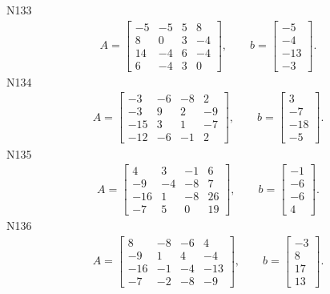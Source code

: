 \documentclass[11pt]{report}
\begin{document}
N133
\begin{align*}
 A = \left[\begin{matrix}-5 & -5 & 5 & 8\\8 & 0 & 3 & -4\\14 & -4 & 6 & -4\\6 & -4 & 3 & 0\end{matrix}\right],
\qquad b = \left[\begin{matrix}-5\\-4\\-13\\-3\end{matrix}\right]. 
 \end{align*}
N134
\begin{align*}
 A = \left[\begin{matrix}-3 & -6 & -8 & 2\\-3 & 9 & 2 & -9\\-15 & 3 & 1 & -7\\-12 & -6 & -1 & 2\end{matrix}\right],
\qquad b = \left[\begin{matrix}3\\-7\\-18\\-5\end{matrix}\right]. 
 \end{align*}
N135
\begin{align*}
 A = \left[\begin{matrix}4 & 3 & -1 & 6\\-9 & -4 & -8 & 7\\-16 & 1 & -8 & 26\\-7 & 5 & 0 & 19\end{matrix}\right],
\qquad b = \left[\begin{matrix}-1\\-6\\-6\\4\end{matrix}\right]. 
 \end{align*}
N136
\begin{align*}
 A = \left[\begin{matrix}8 & -8 & -6 & 4\\-9 & 1 & 4 & -4\\-16 & -1 & -4 & -13\\-7 & -2 & -8 & -9\end{matrix}\right],
\qquad b = \left[\begin{matrix}-3\\8\\17\\13\end{matrix}\right]. 
 \end{align*}
\end{document}
